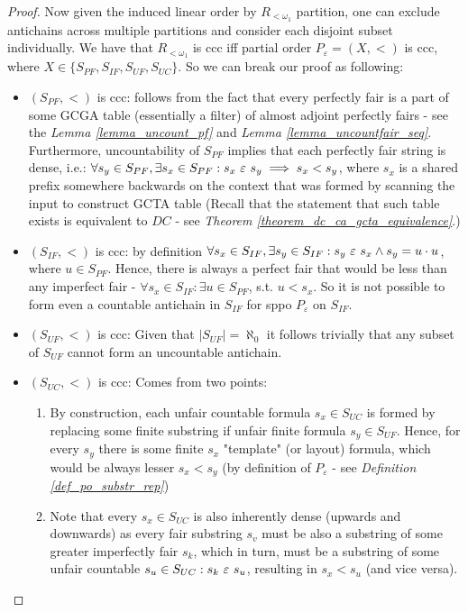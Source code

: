 \begin{proof}
  Now given the induced linear order by $R_{<\omega_1}$ partition, one can exclude antichains across multiple partitions and consider each disjoint subset individually. We have that $R_{<\omega_1}$ is ccc iff partial order $P_{\varepsilon} = (X, <)$ is ccc, where $X \in \{S_{PF}, S_{IF}, S_{UF}, S_{UC}\}$. So we can break our proof as following: 
  \begin{itemize}
    \item $(S_{PF}, <)$ is ccc: follows from the fact that every perfectly fair is a part of some GCGA table (essentially a filter) of almost adjoint perfectly fairs - see the \textit{Lemma \ref{lemma_uncount_pf}} and \textit{Lemma \ref{lemma_uncountfair_seq}}. Furthermore, uncountability of $S_{PF}$ implies that each perfectly fair string is dense, i.e.: $\forall s_y \in S_{PF}, \exists s_x \in S_{PF}: s_x \ \varepsilon\  s_y \implies s_x < s_y$, where $s_x$ is a shared prefix somewhere backwards on the context that was formed by scanning the input to construct GCTA table (Recall that the statement that such table exists is equivalent to $DC$ - see \textit{Theorem \ref{theorem_dc_ca_gcta_equivalence}}.)
    \item $(S_{IF}, <)$ is ccc: by definition $\forall s_x \in S_{IF}, \exists s_y \in S_{IF}: s_y \ \varepsilon\  s_x \land s_y = u \cdot u$, where $u \in S_{PF}$. Hence, there is always a perfect fair that would be less than any imperfect fair - $\forall s_x \in S_{IF}: \exists u \in S_{PF}$, s.t. $u < s_x$. So it is not possible to form even a countable antichain in $S_{IF}$ for sppo $P_{\varepsilon}$ on $S_{IF}$. 
    \item $(S_{UF}, <)$ is ccc: Given that $|S_{UF}| = \aleph_0$ it follows trivially that any subset of $S_{UF}$ cannot form an uncountable antichain. 
    \item $(S_{UC}, <)$ is ccc: Comes from two points: 
      \begin{enumerate}[label=(\alph*)]
        \item By construction, each unfair countable formula $s_x \in S_{UC}$ is formed by replacing some finite substring if unfair finite formula $s_y \in S_{UF}$. Hence, for every $s_y$ there is some finite $s_x$ "template" (or layout) formula, which would be always lesser $s_x < s_y$ (by definition of $P_{\varepsilon}$ - see \textit{Definition \ref{def_po_substr_rep}}) 
        \item  Note that every $s_x \in S_{UC}$ is also inherently dense (upwards and downwards) as every fair substring $s_v$ must be also a substring of some greater imperfectly fair $s_k$, which in turn, must be a substring of some unfair countable $s_u \in S_{UC}: s_k \ \varepsilon\  s_u$, resulting in $s_x < s_u$ (and vice versa).
      \end{enumerate}
  \end{itemize}
\end{proof}

